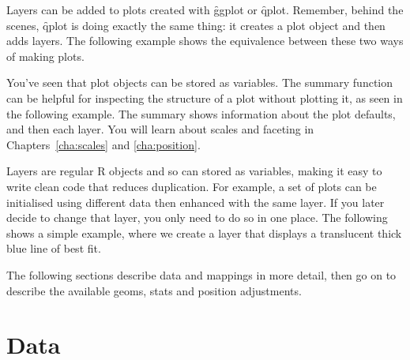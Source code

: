 Layers can be added to plots created with \f{ggplot} or \f{qplot}.  Remember, behind the scenes, \f{qplot} is doing exactly the same thing: it creates a plot object and then adds layers.  The following example shows the equivalence between these two ways of making plots.

% 
% 


You've seen that plot objects can be stored as variables. The summary function can be helpful for inspecting the structure of a plot without plotting it, as seen in the following example.  The summary shows information about the plot defaults, and then each layer. You will learn about scales and faceting in Chapters~\ref{cha:scales} and \ref{cha:position}.

%
%


Layers are regular R objects and so can stored as variables, making it easy to write clean code that reduces duplication.  For example, a set of plots can be initialised using different data then enhanced with the same layer.  If you later decide to change that layer, you only need to do so in one place.  The following shows a simple example, where we create a layer that displays a translucent thick blue line of best fit.

% 


The following sections describe data and mappings in more detail, then go on to describe the available geoms, stats and position adjustments.

\section{Data}
\label{sec:data}

